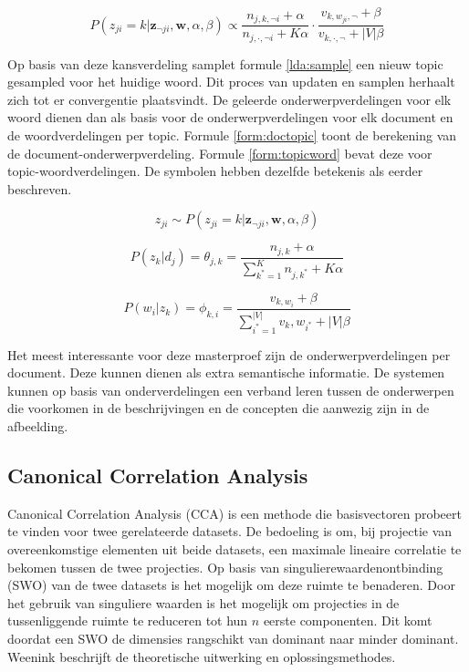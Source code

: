 \begin{equation}
    P(z_{ji} = k | \mathbf{z}_{\neg ji}, \mathbf{w}, \alpha, \beta) \propto \frac{n_{j,k,\neg i} + \alpha}{n_{j, \cdot, \neg i} + K \alpha} \cdot \frac{v_{k,w_{ji}, \neg}+ \beta}{v_{k,\cdot,\neg} + |V|\beta}
    \label{lda:update}
\end{equation}

Op basis van deze kansverdeling samplet formule \eqref{lda:sample} een nieuw topic gesampled voor het huidige woord. Dit proces van updaten en samplen herhaalt zich tot er convergentie plaatsvindt. De geleerde onderwerpverdelingen voor elk woord dienen dan als basis voor de onderwerpverdelingen voor elk document en de woordverdelingen per topic. Formule \eqref{form:doctopic} toont de berekening van de document-onderwerpverdeling. Formule \eqref{form:topicword} bevat deze voor topic-woordverdelingen. De symbolen hebben dezelfde betekenis als eerder beschreven.

\begin{equation}
    z_{ji} \sim  P(z_{ji} = k | \mathbf{z}_{\neg ji}, \mathbf{w}, \alpha, \beta)
    \label{lda:sample}
\end{equation}

\begin{equation}
    P(z_k|d_j) = \theta_{j,k} = \frac{n_{j,k} + \alpha}{\sum_{k^*=1}^K n_{j,k^*} + K\alpha}
    \label{form:doctopic}
\end{equation}

\begin{equation}
    P(w_i|z_k) = \phi_{k,i} = \frac{v_{k,w_i} + \beta}{\sum_{i^*=1}^{|V|} v_k,w_{i^*} + |V|\beta}
    \label{form:topicword}
\end{equation}

Het meest interessante voor deze masterproef zijn de onderwerpverdelingen per document. Deze kunnen dienen als extra semantische informatie. De systemen kunnen op basis van onderverdelingen een verband leren tussen de onderwerpen die voorkomen in de beschrijvingen en de concepten die aanwezig zijn in de afbeelding. 


\subsection{Canonical Correlation Analysis}
\label{sub:stackedcca}
Canonical Correlation Analysis (CCA) is een methode die basisvectoren probeert te vinden voor twee gerelateerde datasets. De bedoeling is om, bij projectie van overeenkomstige elementen uit beide datasets, een maximale lineaire correlatie te bekomen tussen de twee projecties. 
Op basis van singulierewaardenontbinding (SWO) van de twee datasets is het mogelijk om deze ruimte te benaderen. Door het gebruik van singuliere waarden is het mogelijk om projecties in de tussenliggende ruimte te reduceren tot hun $n$ eerste componenten. Dit komt doordat een SWO de dimensies rangschikt van dominant naar minder dominant. Weenink\cite{Weenink2003} beschrijft de theoretische uitwerking en oplossingsmethodes.

